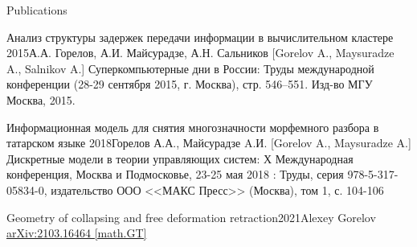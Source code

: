 \documentclass{resume}
\begin{document}
\begin{rSection}{Publications}
  \begin{rSubsection}{Анализ структуры задержек передачи информации в вычислительном кластере
      }{2015}{А.А. Горелов, А.И. Майсурадзе, А.Н. Сальников [Gorelov A., Maysuradze A., Salnikov A.]}{}
    Суперкомпьютерные дни в России: Труды международной конференции (28-29 сентября 2015, г. Москва), стр. 546–551. Изд-во МГУ Москва, 2015.
  \end{rSubsection}

  \begin{rSubsection}{Информационная модель для снятия многозначности морфемного разбора в татарском
      языке }{2018}{Горелов А.А., Майсурадзе A.И. [Gorelov A., Maysuradze A.]}
    Дискретные модели в теории управляющих систем: Х Международная конференция, Москва и Подмосковье,
    23-25 мая 2018 : Труды, серия 978-5-317-05834-0, издательство ООО <<МАКС Пресс>> (Москва), том 1, с. 104-106
  \end{rSubsection}

  \begin{rSubsection}{Geometry of collapsing and free deformation retraction}{2021}{Alexey Gorelov}{}
    \href{https://arxiv.org/abs/2103.16464}{arXiv:2103.16464 [math.GT]}
  \end{rSubsection}
\end{rSection}
\end{document}
